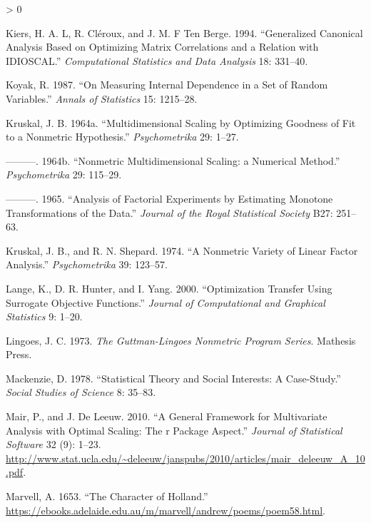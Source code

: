 \documentclass[
  12pt,
]{book}
\newlength{\cslhangindent}
\newenvironment{CSLReferences}[2] %
 {%
  \setlength{\parindent}{0pt}
  \ifodd #1 \everypar{\setlength{\hangindent}{\cslhangindent}}\ignorespaces\fi
  \ifnum #2 > 0
  \setlength{\parskip}{#2\baselineskip}
  \fi
 }%
 {}
\begin{document}
\begin{CSLReferences}{1}{0}
\leavevmode\hypertarget{ref-kiers_cleroux_tenberge_94}{}%
Kiers, H. A. L, R. Cléroux, and J. M. F Ten Berge. 1994. {``{Generalized Canonical Analysis Based on Optimizing Matrix Correlations and a Relation with IDIOSCAL}.''} \emph{Computational Statistics and Data Analysis} 18: 331--40.

\leavevmode\hypertarget{ref-koyak_87}{}%
Koyak, R. 1987. {``{On Measuring Internal Dependence in a Set of Random Variables}.''} \emph{Annals of Statistics} 15: 1215--28.

\leavevmode\hypertarget{ref-kruskal_64a}{}%
Kruskal, J. B. 1964a. {``{Multidimensional Scaling by Optimizing Goodness of Fit to a Nonmetric Hypothesis}.''} \emph{Psychometrika} 29: 1--27.

\leavevmode\hypertarget{ref-kruskal_64b}{}%
---------. 1964b. {``{Nonmetric Multidimensional Scaling: a Numerical Method}.''} \emph{Psychometrika} 29: 115--29.

\leavevmode\hypertarget{ref-kruskal_65}{}%
---------. 1965. {``{Analysis of Factorial Experiments by Estimating Monotone Transformations of the Data}.''} \emph{Journal of the Royal Statistical Society} B27: 251--63.

\leavevmode\hypertarget{ref-kruskal_shepard_74}{}%
Kruskal, J. B., and R. N. Shepard. 1974. {``{A Nonmetric Variety of Linear Factor Analysis}.''} \emph{Psychometrika} 39: 123--57.

\leavevmode\hypertarget{ref-lange_hunter_yang_00}{}%
Lange, K., D. R. Hunter, and I. Yang. 2000. {``{Optimization Transfer Using Surrogate Objective Functions}.''} \emph{Journal of Computational and Graphical Statistics} 9: 1--20.

\leavevmode\hypertarget{ref-lingoes_73}{}%
Lingoes, J. C. 1973. \emph{{The Guttman-Lingoes Nonmetric Program Series}}. Mathesis Press.

\leavevmode\hypertarget{ref-mackenzie_78}{}%
Mackenzie, D. 1978. {``{Statistical Theory and Social Interests: A Case-Study}.''} \emph{Social Studies of Science} 8: 35--83.

\leavevmode\hypertarget{ref-mair_deleeuw_A_10}{}%
Mair, P., and J. De Leeuw. 2010. {``A General Framework for Multivariate Analysis with Optimal Scaling: The r Package Aspect.''} \emph{Journal of Statistical Software} 32 (9): 1--23. \url{http://www.stat.ucla.edu/~deleeuw/janspubs/2010/articles/mair_deleeuw_A_10.pdf}.

\leavevmode\hypertarget{ref-marvell_53}{}%
Marvell, A. 1653. {``The Character of Holland.''} \url{https://ebooks.adelaide.edu.au/m/marvell/andrew/poems/poem58.html}.


\end{CSLReferences}
\end{document}
